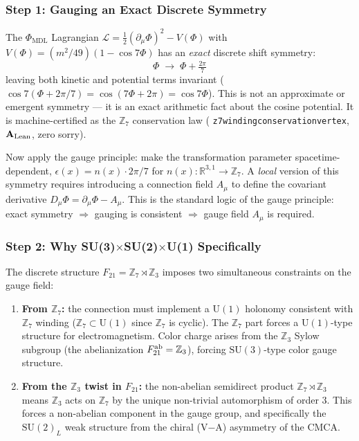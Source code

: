 \documentclass[11pt,openany]{book}
\theoremstyle{remark}
\newcommand{\PHIMDL}{\Phi_{\mathrm{MDL}}}
\newcommand{\ZS}{\mathbb{Z}_7}
\newcommand{\lean}[1]{%
  \penalty-100
  \begingroup\def\_{\textunderscore\allowbreak}\texttt{#1}\endgroup}
\newcommand{\CatAL}{\ensuremath{\textbf{A}_{\rm Lean}}}
\begin{document}
\subsubsection*{Step 1: Gauging an Exact Discrete Symmetry}

The $\PHIMDL$ Lagrangian
$\mathcal{L} = \tfrac{1}{2}(\partial_\mu\Phi)^2 - V(\Phi)$
with $V(\Phi) = (m^2/49)(1-\cos 7\Phi)$ has an \emph{exact} discrete shift symmetry:
\[
  \Phi \;\to\; \Phi + \tfrac{2\pi}{7}
\]
leaving both kinetic and potential terms invariant ($\cos 7(\Phi + 2\pi/7) = \cos(7\Phi+2\pi) = \cos7\Phi$).
This is not an approximate or emergent symmetry — it is an exact arithmetic fact about
the cosine potential.  It is machine-certified as the $\ZS$ conservation law
(\lean{z7\_winding\_conservation\_vertex}, \CatAL, zero sorry).

Now apply the gauge principle: make the transformation parameter spacetime-dependent,
$\epsilon(x) = n(x)\cdot 2\pi/7$ for $n(x):\mathbb{R}^{3,1}\to\mathbb{Z}_7$.
A \emph{local} version of this symmetry requires introducing a connection field
$A_\mu$ to define the covariant derivative
$D_\mu\Phi = \partial_\mu\Phi - A_\mu$.
This is the standard logic of the gauge principle: exact symmetry $\Rightarrow$ gauging
is consistent $\Rightarrow$ gauge field $A_\mu$ is required.

\subsubsection*{Step 2: Why SU(3)\texorpdfstring{$\times$}{x}SU(2)\texorpdfstring{$\times$}{x}U(1) Specifically}

The discrete structure $F_{21} = \ZS\rtimes\mathbb{Z}_3$ imposes two simultaneous
constraints on the gauge field:
\begin{enumerate}[itemsep=3pt]
\item \textbf{From $\ZS$:} the connection must implement a $\mathrm{U}(1)$ holonomy
  consistent with $\mathbb{Z}_7$ winding ($\mathbb{Z}_7 \subset \mathrm{U}(1)$ since
  $\mathbb{Z}_7$ is cyclic).  The $\ZS$ part forces a $\mathrm{U}(1)$-type structure
  for electromagnetism.  Color charge arises from the $\mathbb{Z}_3$ Sylow subgroup
  (the abelianization $F_{21}^{\rm ab} = \mathbb{Z}_3$), forcing $\mathrm{SU}(3)$-type
  color gauge structure.

\item \textbf{From the $\mathbb{Z}_3$ twist in $F_{21}$:} the non-abelian semidirect
  product $\ZS\rtimes\mathbb{Z}_3$ means $\mathbb{Z}_3$ acts on $\ZS$ by the unique
  non-trivial automorphism of order 3.  This forces a non-abelian component in the
  gauge group, and specifically the $\mathrm{SU}(2)_L$ weak structure from the
  chiral (V$-$A) asymmetry of the CMCA.
\end{enumerate}
\end{document}

